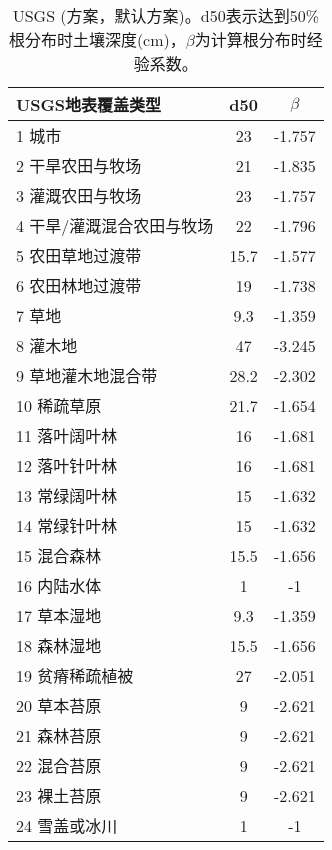 \begin{table}[htbp]
    \centering
    \caption{USGS (\citet{schenk2002rooting}方案，默认方案)。d50表示达到50\%根分布时土壤深度(cm)，$\beta$为计算根分布时经验系数。}
    \label{tab:USGSSchenkANDJackson2002方案默认方案}
    \begin{tabular}{@{}lcc@{}}
    \toprule
    USGS地表覆盖类型     & d50  & $\beta$ \\ \midrule
    1 城市           & 23   & -1.757  \\
    2 干旱农田与牧场      & 21   & -1.835  \\
    3 灌溉农田与牧场      & 23   & -1.757  \\
    4 干旱/灌溉混合农田与牧场 & 22   & -1.796  \\
    5 农田草地过渡带      & 15.7 & -1.577  \\
    6 农田林地过渡带      & 19   & -1.738  \\
    7 草地           & 9.3  & -1.359  \\
    8 灌木地          & 47   & -3.245  \\
    9 草地灌木地混合带     & 28.2 & -2.302  \\
    10 稀疏草原        & 21.7 & -1.654  \\
    11 落叶阔叶林       & 16   & -1.681  \\
    12 落叶针叶林       & 16   & -1.681  \\
    13 常绿阔叶林       & 15   & -1.632  \\
    14 常绿针叶林       & 15   & -1.632  \\
    15 混合森林        & 15.5 & -1.656  \\
    16 内陆水体        & 1    & -1      \\
    17 草本湿地        & 9.3  & -1.359  \\
    18 森林湿地        & 15.5 & -1.656  \\
    19 贫瘠稀疏植被      & 27   & -2.051  \\
    20 草本苔原        & 9    & -2.621  \\
    21 森林苔原        & 9    & -2.621  \\
    22 混合苔原        & 9    & -2.621  \\
    23 裸土苔原        & 9    & -2.621  \\
    24 雪盖或冰川       & 1    & -1      \\ \bottomrule
\end{tabular}
\end{table}


